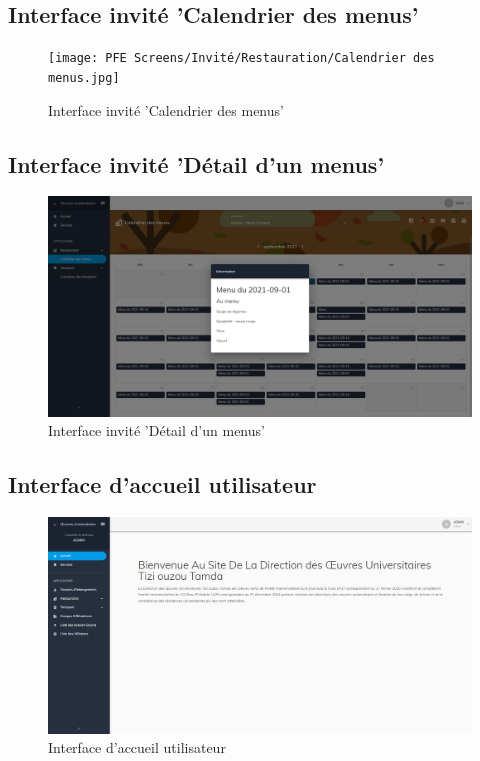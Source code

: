     \subsection{Interface invité 'Calendrier des menus'}
    \begin{figure}[H]
        \centering
        \texttt{[image: PFE Screens/Invité/Restauration/Calendrier des menus.jpg]}
        \caption{Interface invité 'Calendrier des menus'}
    \end{figure}

    \subsection{Interface invité 'Détail d'un menus'}
    \begin{figure}[H]
        \centering
        \includegraphics[scale=0.21]{PFE Screens/Invité/Restauration/Calendrier des menus - Détail.jpg}
        \caption{Interface invité 'Détail d'un menus'}
    \end{figure}
    
    \subsection{Interface d'accueil utilisateur}
    \begin{figure}[H]
        \centering
        \includegraphics[scale=0.21]{PFE Screens/Admin/Accueil.jpg}
        \caption{Interface d'accueil utilisateur}
    \end{figure}

